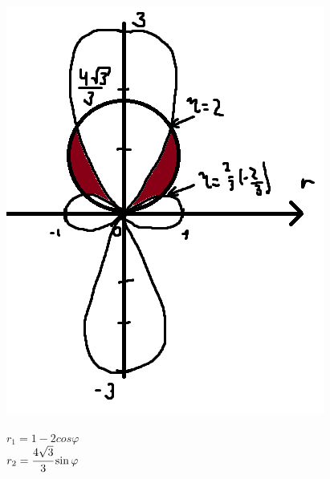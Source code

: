 \begin{minipage}{0.3\textwidth}
\includegraphics[width=\linewidth]{pics/pic1.png}
\end{minipage}
\hfill
\begin{minipage}{0.6\textwidth}\raggedleft
$r_1 = 1-2cos\varphi$ \\
$r_2 = \cfrac{4 \sqrt{3}}{3} \sin \varphi$
\end{minipage}

